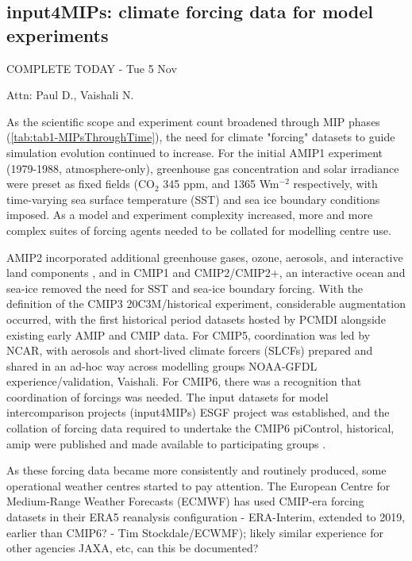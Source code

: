 \documentclass[gmd, preprint]{copernicus}
\def\cred#1{{\color{red}#1}}
\def\cblue#1{{\color{blue}#1}}
\begin{document}
\subsection{input4MIPs: climate forcing data for model experiments}
\label{sec:input4MIPs}
\cblue{COMPLETE TODAY - Tue 5 Nov}

\cred{Attn: Paul D., Vaishali N.}

As the scientific scope and experiment count broadened through MIP phases (\autoref{tab:tab1-MIPsThroughTime}), the need for climate "forcing" datasets to guide simulation evolution continued to increase. For the initial AMIP1  experiment (1979-1988, atmosphere-only), greenhouse gas concentration and solar irradiance were preset as fixed fields (CO$_{2}$ 345 ppm, and 1365 Wm$^{-2}$ respectively, with time-varying sea surface temperature (SST) and sea ice boundary conditions imposed. As a model and experiment complexity increased, more and more complex suites of forcing agents needed to be collated for modelling centre use.

AMIP2 incorporated additional greenhouse gases, ozone, aerosols, and interactive land components \citep{gleckler_amip_1996-1,liang_pcmdi_1997}, and in CMIP1 and CMIP2/CMIP2+, an interactive ocean and sea-ice removed the need for SST and sea-ice boundary forcing. With the definition of the CMIP3 20C3M/historical experiment, considerable augmentation occurred, with the first historical period datasets hosted by PCMDI alongside existing early AMIP and CMIP data. For CMIP5, coordination was led by NCAR, with aerosols and short-lived climate forcers (SLCFs) prepared and shared in an ad-hoc way across modelling groups \cred{NOAA-GFDL experience/validation, Vaishali}. For CMIP6, there was a recognition that coordination of forcings was needed. The input datasets for model intercomparison projects (input4MIPs) ESGF project was established, and the collation of forcing data required to undertake the CMIP6 piControl, historical, amip were published and made available to participating groups \citep{durack_toward_2018}.

\cred{As these forcing data became more consistently and routinely produced, some operational weather centres started to pay attention. The European Centre for Medium-Range Weather Forecasts (ECMWF) has used CMIP-era forcing datasets in their ERA5 reanalysis configuration - ERA-Interim, extended to 2019, earlier than CMIP6? - Tim Stockdale/ECWMF); likely similar experience for other agencies JAXA, etc, can this be documented?}
\end{document}
